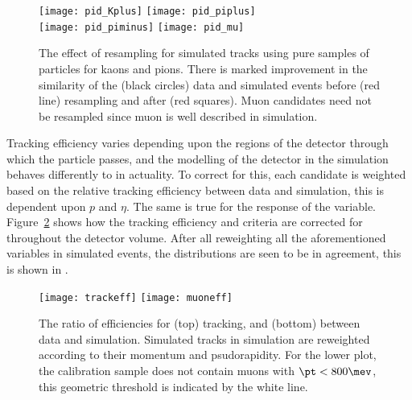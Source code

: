 \begin{figure}[t]
  \begin{center}
    \texttt{[image: pid\_Kplus]}
    \texttt{[image: pid\_piplus]}\\
    \texttt{[image: pid\_piminus]}
    \texttt{[image: pid\_mu]}
    \caption[Effect of resampling PID variables in simulation]
    {
      The effect of \pid resampling for simulated tracks using pure samples of particles for kaons
      and pions.
      There is marked improvement in the similarity of the (black circles) \btojpsikpipi data and
      simulated events before (red line) resampling and after (red squares).
      Muon candidates need not be resampled since muon \pid is well described in simulation.
    }
    \label{fig:hhh:pid}
  \end{center}
\end{figure}


Tracking efficiency varies depending upon the regions of the detector through which the particle
passes, and the modelling of the detector in the simulation behaves differently to in actuality.
To correct for this, each candidate is weighted based on the relative tracking efficiency between
data and simulation, this is dependent upon $p$ and $\eta$.
The same is true for the response of the \ismuon variable.
Figure~\ref{fig:hhh:trackeff} shows how the tracking efficiency and \ismuon criteria are corrected
for throughout the detector volume.
After all reweighting all the aforementioned variables in simulated events, the \BDT distributions
are seen to be in agreement, this is shown in .

\begin{figure}[t]
  \begin{center}
    \texttt{[image: trackeff]}
    \texttt{[image: muoneff]}
  \end{center}
  \caption[Corrections for {\tt isMuon} and tracking efficiency in simulation]
  {
    The ratio of efficiencies for (top) tracking, and (bottom) \ismuon between data and simulation.
    Simulated tracks in simulation are reweighted according to their momentum and psudorapidity.
    For the lower plot, the calibration sample does not contain muons with $\pt<800\mev$, this
    geometric threshold is indicated by the white line.
  }
  \label{fig:hhh:trackeff}
\end{figure}

